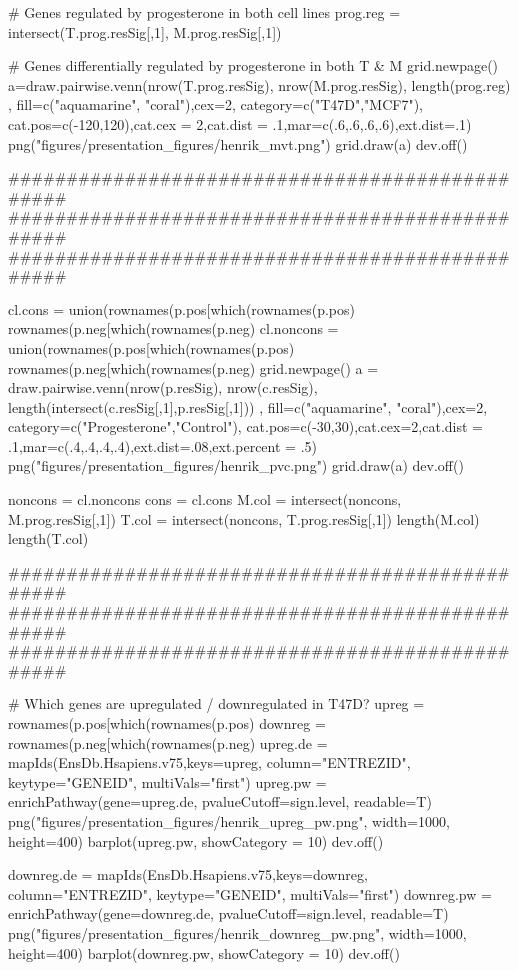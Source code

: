 \documentclass[10pt, twocolumn]{article}\usepackage[]{graphicx}\usepackage[]{color}
\theoremstyle{plain}
\begin{document}
\begin{Schunk}
\begin{Sinput}
# Genes regulated by progesterone in both cell lines
prog.reg = intersect(T.prog.resSig[,1], M.prog.resSig[,1])

# Genes differentially regulated by progesterone in both T & M
grid.newpage()
a=draw.pairwise.venn(nrow(T.prog.resSig), nrow(M.prog.resSig), length(prog.reg) , fill=c("aquamarine", "coral"),cex=2, category=c("T47D","MCF7"), cat.pos=c(-120,120),cat.cex = 2,cat.dist = .1,mar=c(.6,.6,.6,.6),ext.dist=.1)
png("figures/presentation_figures/henrik_mvt.png")
grid.draw(a)
dev.off()

################################################
################################################
################################################

cl.cons     = union(rownames(p.pos[which(rownames(p.pos) %in% rownames(c.pos)), ]),
                    rownames(p.neg[which(rownames(p.neg) %in% rownames(c.neg)), ]))
cl.noncons  = union(rownames(p.pos[which(rownames(p.pos) %in% rownames(c.neg)), ]),
                    rownames(p.neg[which(rownames(p.neg) %in% rownames(c.pos)), ]))
grid.newpage()
a = draw.pairwise.venn(nrow(p.resSig), nrow(c.resSig), length(intersect(c.resSig[,1],p.resSig[,1])) , fill=c("aquamarine", "coral"),cex=2, category=c("Progesterone","Control"), cat.pos=c(-30,30),cat.cex=2,cat.dist = .1,mar=c(.4,.4,.4,.4),ext.dist=.08,ext.percent = .5)
png("figures/presentation_figures/henrik_pvc.png")
grid.draw(a)
dev.off()

noncons = cl.noncons
cons    = cl.cons
M.col   = intersect(noncons, M.prog.resSig[,1])
T.col   = intersect(noncons, T.prog.resSig[,1])
length(M.col)
length(T.col)

################################################
################################################
################################################

# Which genes are upregulated / downregulated in T47D? 
upreg    = rownames(p.pos[which(rownames(p.pos) %in% rownames(c.pos)), ])
downreg  = rownames(p.neg[which(rownames(p.neg) %in% rownames(c.neg)), ])
upreg.de = mapIds(EnsDb.Hsapiens.v75,keys=upreg, column="ENTREZID", keytype="GENEID", multiVals="first")
upreg.pw = enrichPathway(gene=upreg.de, pvalueCutoff=sign.level, readable=T)
png("figures/presentation_figures/henrik_upreg_pw.png", width=1000, height=400)
barplot(upreg.pw, showCategory = 10)
dev.off()

downreg.de = mapIds(EnsDb.Hsapiens.v75,keys=downreg, column="ENTREZID", keytype="GENEID", multiVals="first")
downreg.pw = enrichPathway(gene=downreg.de, pvalueCutoff=sign.level, readable=T)
png("figures/presentation_figures/henrik_downreg_pw.png", width=1000, height=400)
barplot(downreg.pw, showCategory = 10)
dev.off()


\end{Sinput}
\end{Schunk}
\end{document}
